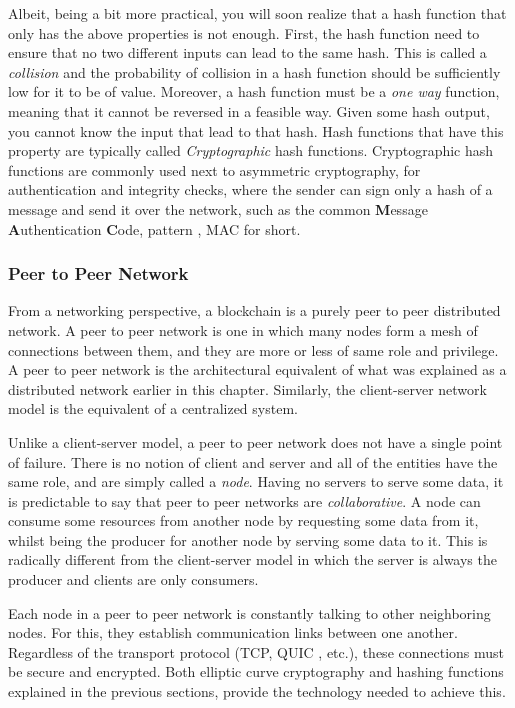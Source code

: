 Albeit, being a bit more practical, you will soon realize that a hash function that only has the
above properties is not enough. First, the hash function need to ensure that no two different inputs
can lead to the same hash. This is called a \textit{collision} and the probability of collision in a
hash function should be sufficiently low for it to be of value. Moreover, a hash function must be a
\textit{one way} function, meaning that it cannot be reversed in a feasible way. Given some hash
output, you cannot know the input that lead to that hash. Hash functions that have this property are
typically called \textit{Cryptographic} hash functions. Cryptographic hash functions
are commonly used next to asymmetric cryptography, for authentication and integrity checks, where
the sender can sign only a hash of a message and send it over the network, such as the common
\textbf{M}essage \textbf{A}uthentication \textbf{C}ode, pattern
\cite{HMAC_Bellare_Canetti_Krawczyk_1996}, MAC for short.

\subsubsection{Peer to Peer Network} \label{chap_bg:subsec:p2p}

From a networking perspective, a blockchain is a purely peer to peer distributed network. A peer to
peer network is one in which many nodes form a mesh of connections between them, and they are more
or less of same role and privilege. A peer to peer network is the architectural equivalent of what
was explained as a distributed network earlier in this chapter. Similarly, the client-server network
model is the equivalent of a centralized system.

Unlike a client-server model, a peer to peer network does not have a single point of failure. There
is no notion of client and server and all of the entities have the same role, and are simply called
a \textit{node}. Having no servers to serve some data, it is predictable to say that peer to peer
networks are \textit{collaborative}. A node can consume some resources from another node by
requesting some data from it, whilst being the producer for another node by serving some data to it.
This is radically different from the client-server model in which the server is always the producer
and clients are only consumers.

Each node in a peer to peer network is constantly talking to other neighboring nodes. For this, they
establish communication links between one another. Regardless of the transport protocol (TCP, QUIC
\cite{quic}, etc.), these connections must be secure and encrypted. Both elliptic curve cryptography
and hashing functions explained in the previous sections, provide the technology needed to achieve
this.

